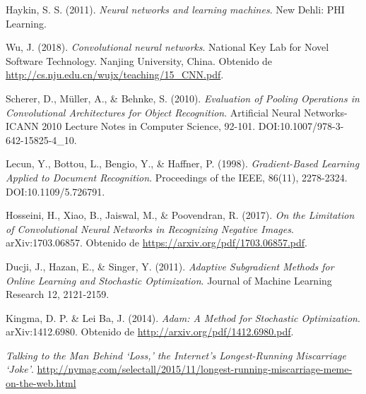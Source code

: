 \documentclass[spanish,11pt,letterpaper]{article}
\begin{document}
\begin{thebibliography}{9}
Haykin, S. S. (2011).
\textit{Neural networks and learning machines}.
New Dehli: PHI Learning.

Wu, J. (2018).
\textit{Convolutional neural networks}.
National Key Lab for Novel Software Technology. Nanjing University, China.
Obtenido de \url{http://cs.nju.edu.cn/wujx/teaching/15_CNN.pdf}.

Scherer, D., M\"uller, A., \& Behnke, S. (2010).
\textit{Evaluation of Pooling Operations in Convolutional Architectures for Object Recognition}.
Artificial Neural Networks-ICANN 2010 Lecture Notes in Computer Science, 92-101. DOI:10.1007/978-3-642-15825-4\_10.

Lecun, Y., Bottou, L., Bengio, Y., \& Haffner, P. (1998).
\textit{Gradient-Based Learning Applied to Document Recognition}.
Proceedings of the IEEE, 86(11), 2278-2324. DOI:10.1109/5.726791.

Hosseini, H., Xiao, B., Jaiswal, M., \& Poovendran, R. (2017).
\textit{On the Limitation of Convolutional Neural Networks in Recognizing Negative Images}.
arXiv:1703.06857. Obtenido de \url{https://arxiv.org/pdf/1703.06857.pdf}.

Ducji, J., Hazan, E., \& Singer, Y. (2011).
\textit{Adaptive Subgradient Methods for Online Learning and Stochastic Optimization}.
Journal of Machine Learning Research 12, 2121-2159.

Kingma, D. P. \& Lei Ba, J. (2014).
\textit{Adam: A Method for Stochastic Optimization}.
arXiv:1412.6980. Obtenido de \url{http://arxiv.org/pdf/1412.6980.pdf}.

\textit{Talking to the Man Behind `Loss,' the Internet's Longest-Running Miscarriage `Joke'}.
\url{http://nymag.com/selectall/2015/11/longest-running-miscarriage-meme-on-the-web.html}

\end{thebibliography}
\end{document}
